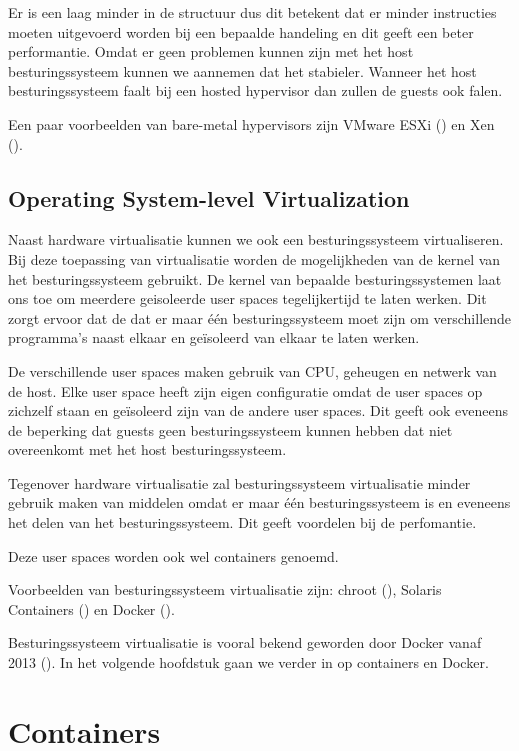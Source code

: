 \documentclass[pdftex,a4paper,12pt,twoside]{report}
\begin{document}
Er is een laag minder in de structuur dus dit betekent dat er minder instructies moeten uitgevoerd worden bij een bepaalde handeling en dit geeft een beter performantie. Omdat er geen problemen kunnen zijn met het host besturingssysteem kunnen we aannemen dat het stabieler. Wanneer het host besturingssysteem faalt bij een hosted hypervisor dan zullen de guests ook falen.

Een paar voorbeelden van bare-metal hypervisors zijn VMware ESXi (\cite{VMware2016a}) en Xen (\cite{XenProject2016}).

\section{Operating System-level Virtualization}

Naast hardware virtualisatie kunnen we ook een besturingssysteem virtualiseren. Bij deze toepassing van virtualisatie worden de mogelijkheden van de kernel van het besturingssysteem gebruikt. De kernel van bepaalde besturingssystemen laat ons toe om meerdere geisoleerde user spaces tegelijkertijd te laten werken. Dit zorgt ervoor dat de dat er maar één besturingssysteem moet zijn om verschillende programma's naast elkaar en geïsoleerd van elkaar te laten werken.

De verschillende user spaces maken gebruik van CPU, geheugen en netwerk van de host. Elke user space heeft zijn eigen configuratie omdat de user spaces op zichzelf staan en geïsoleerd zijn van de andere user spaces. Dit geeft ook eveneens de beperking dat guests geen besturingssysteem kunnen hebben dat niet overeenkomt met het host besturingssysteem.

Tegenover hardware virtualisatie zal besturingssysteem virtualisatie minder gebruik maken van middelen omdat er maar één besturingssysteem is en eveneens het delen van het besturingssysteem. Dit geeft voordelen bij de perfomantie.

Deze user spaces worden ook wel containers genoemd.

Voorbeelden van besturingssysteem virtualisatie zijn: chroot (\cite{Linux}), Solaris Containers (\cite{Oracle2016a}) en Docker (\cite{Docker2016}).

Besturingssysteem virtualisatie is vooral bekend geworden door Docker vanaf 2013 (\cite{Hykes2013}). In het volgende hoofdstuk gaan we verder in op containers en Docker.

\chapter{Containers}
\label{ch:Containers}
\end{document}
